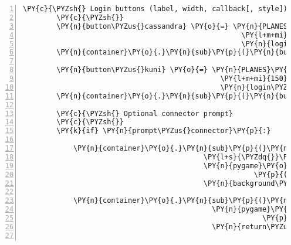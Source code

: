 \begin{Verbatim}[commandchars=\\\{\},numbers=left,firstnumber=1,stepnumber=1]
        \PY{c}{\PYZsh{} Login buttons (label, width, callback[, style])}
        \PY{c}{\PYZsh{}}
        \PY{n}{button\PYZus{}cassandra} \PY{o}{=} \PY{n}{PLANES}\PY{o}{.}\PY{n}{gui}\PY{o}{.}\PY{n}{lmr}\PY{o}{.}\PY{n}{LMRButton}\PY{p}{(}\PY{l+s}{\PYZdq{}}\PY{l+s}{Als Fee Cassandra spielen}\PY{l+s}{\PYZdq{}}\PY{p}{,}
                                                    \PY{l+m+mi}{150}\PY{p}{,}
                                                    \PY{n}{login\PYZus{}cassandra\PYZus{}callback}\PY{p}{)}
        \PY{n}{container}\PY{o}{.}\PY{n}{sub}\PY{p}{(}\PY{n}{button\PYZus{}cassandra}\PY{p}{)}

        \PY{n}{button\PYZus{}kuni} \PY{o}{=} \PY{n}{PLANES}\PY{o}{.}\PY{n}{gui}\PY{o}{.}\PY{n}{lmr}\PY{o}{.}\PY{n}{LMRButton}\PY{p}{(}\PY{l+s}{\PYZdq{}}\PY{l+s}{Als Gnom Kuni spielen}\PY{l+s}{\PYZdq{}}\PY{p}{,}
                                               \PY{l+m+mi}{150}\PY{p}{,}
                                               \PY{n}{login\PYZus{}kuni\PYZus{}callback}\PY{p}{)}
        \PY{n}{container}\PY{o}{.}\PY{n}{sub}\PY{p}{(}\PY{n}{button\PYZus{}kuni}\PY{p}{)}

        \PY{c}{\PYZsh{} Optional connector prompt}
        \PY{c}{\PYZsh{}}
        \PY{k}{if} \PY{n}{prompt\PYZus{}connector}\PY{p}{:}

            \PY{n}{container}\PY{o}{.}\PY{n}{sub}\PY{p}{(}\PY{n}{PLANES}\PY{o}{.}\PY{n}{gui}\PY{o}{.}\PY{n}{Label}\PY{p}{(}\PY{l+s}{\PYZdq{}}\PY{l+s}{connector\PYZus{}caption}\PY{l+s}{\PYZdq{}}\PY{p}{,}
                                           \PY{l+s}{\PYZdq{}}\PY{l+s}{Server IP}\PY{l+s}{\PYZdq{}}\PY{p}{,}
                                           \PY{n}{pygame}\PY{o}{.}\PY{n}{Rect}\PY{p}{(}\PY{p}{(}\PY{l+m+mi}{0}\PY{p}{,} \PY{l+m+mi}{0}\PY{p}{)}\PY{p}{,}
                                                       \PY{p}{(}\PY{l+m+mi}{150}\PY{p}{,} \PY{l+m+mi}{30}\PY{p}{)}\PY{p}{)}\PY{p}{,}
                                           \PY{n}{background\PYZus{}color}\PY{o}{=}\PY{p}{(}\PY{l+m+mi}{128}\PY{p}{,} \PY{l+m+mi}{128}\PY{p}{,} \PY{l+m+mi}{128}\PY{p}{,} \PY{l+m+mi}{0}\PY{p}{)}\PY{p}{)}\PY{p}{)}

            \PY{n}{container}\PY{o}{.}\PY{n}{sub}\PY{p}{(}\PY{n}{PLANES}\PY{o}{.}\PY{n}{gui}\PY{o}{.}\PY{n}{TextBox}\PY{p}{(}\PY{l+s}{\PYZdq{}}\PY{l+s}{connector}\PY{l+s}{\PYZdq{}}\PY{p}{,}
                                             \PY{n}{pygame}\PY{o}{.}\PY{n}{Rect}\PY{p}{(}\PY{p}{(}\PY{l+m+mi}{0}\PY{p}{,} \PY{l+m+mi}{0}\PY{p}{)}\PY{p}{,}
                                                         \PY{p}{(}\PY{l+m+mi}{150}\PY{p}{,} \PY{l+m+mi}{30}\PY{p}{)}\PY{p}{)}\PY{p}{,}
                                             \PY{n}{return\PYZus{}callback}\PY{o}{=}\PY{n+nb+bp}{None}\PY{p}{)}\PY{p}{)}


\end{Verbatim}
